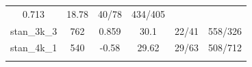 \documentclass[]{article}
\begin{document}
\begin{longtable}[]{@{}cccccc@{}}
\begin{minipage}[t]{0.11\columnwidth}
0.713\strut
\end{minipage} & \begin{minipage}[t]{0.13\columnwidth}\centering\strut
18.78\strut
\end{minipage} & \begin{minipage}[t]{0.18\columnwidth}\centering\strut
40/78\strut
\end{minipage} & \begin{minipage}[t]{0.22\columnwidth}\centering\strut
434/405\strut
\end{minipage}\tabularnewline
\begin{minipage}[t]{0.11\columnwidth}\centering\strut
stan\_3k\_3\strut
\end{minipage} & \begin{minipage}[t]{0.07\columnwidth}\centering\strut
762\strut
\end{minipage} & \begin{minipage}[t]{0.11\columnwidth}\centering\strut
0.859\strut
\end{minipage} & \begin{minipage}[t]{0.13\columnwidth}\centering\strut
30.1\strut
\end{minipage} & \begin{minipage}[t]{0.18\columnwidth}\centering\strut
22/41\strut
\end{minipage} & \begin{minipage}[t]{0.22\columnwidth}\centering\strut
558/326\strut
\end{minipage}\tabularnewline
\begin{minipage}[t]{0.11\columnwidth}\centering\strut
stan\_4k\_1\strut
\end{minipage} & \begin{minipage}[t]{0.07\columnwidth}\centering\strut
540\strut
\end{minipage} & \begin{minipage}[t]{0.11\columnwidth}\centering\strut
-0.58\strut
\end{minipage} & \begin{minipage}[t]{0.13\columnwidth}\centering\strut
29.62\strut
\end{minipage} & \begin{minipage}[t]{0.18\columnwidth}\centering\strut
29/63\strut
\end{minipage} & \begin{minipage}[t]{0.22\columnwidth}\centering\strut
508/712\strut
\end{minipage}\tabularnewline
\begin{minipage}[t]{0.11\columnwidth}\centering\strut

\end{minipage}
\end{longtable}
\end{document}
